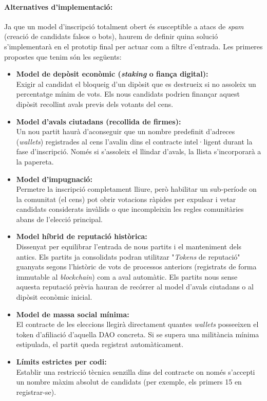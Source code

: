\paragraph{Alternatives d'implementació:}
Ja que un model d'inscripció totalment obert és susceptible a atacs de \textit{spam} (creació de candidats falsos o bots), haurem de definir quina solució s'implementarà en el prototip final per actuar com a filtre d'entrada. Les primeres propostes que tenim són les següents:

\begin{itemize}
    \item \textbf{Model de depòsit econòmic (\textit{staking} o fiança digital):} \\ Exigir al candidat el bloqueig d'un dipòsit que es destrueix si no assoleix un percentatge mínim de vots. Els nous candidats podrien finançar aquest dipòsit recollint avals previs dels votants del cens.
    \item \textbf{Model d'avals ciutadans (recollida de firmes):} \\ Un nou partit haurà d'aconseguir que un nombre predefinit d'adreces (\textit{wallets}) registrades al cens l'avalin dins el contracte intel·ligent durant la fase d'inscripció. Només si s'assoleix el llindar d'avals, la llista s'incorporarà a la papereta.
    \item \textbf{Model d'impugnació:} \\ Permetre la inscripció completament lliure, però habilitar un sub-període on la comunitat (el cens) pot obrir votacions ràpides per expulsar i vetar candidats considerats invàlids o que incompleixin les regles comunitàries abans de l'elecció principal.
    \item \textbf{Model híbrid de reputació històrica:} \\ Dissenyat per equilibrar l'entrada de nous partits i el manteniment dels antics. Els partits ja consolidats podran utilitzar "\textit{Tokens} de reputació" guanyats segons l'històric de vots de processos anteriors (registrats de forma immutable al \textit{blockchain}) com a aval automàtic. Els partits nous sense aquesta reputació prèvia hauran de recórrer al model d'avals ciutadans o al dipòsit econòmic inicial.
    \item \textbf{Model de massa social mínima:} \\ El contracte de les eleccions llegirà directament quantes \textit{wallets} posseeixen el token d'afiliació d'aquella DAO concreta. Si se supera una militància mínima estipulada, el partit queda registrat automàticament.
    \item \textbf{Límits estrictes per codi:} \\ Establir una restricció tècnica senzilla dins del contracte on només s'accepti un nombre màxim absolut de candidats (per exemple, els primers 15 en registrar-se).
\end{itemize}

